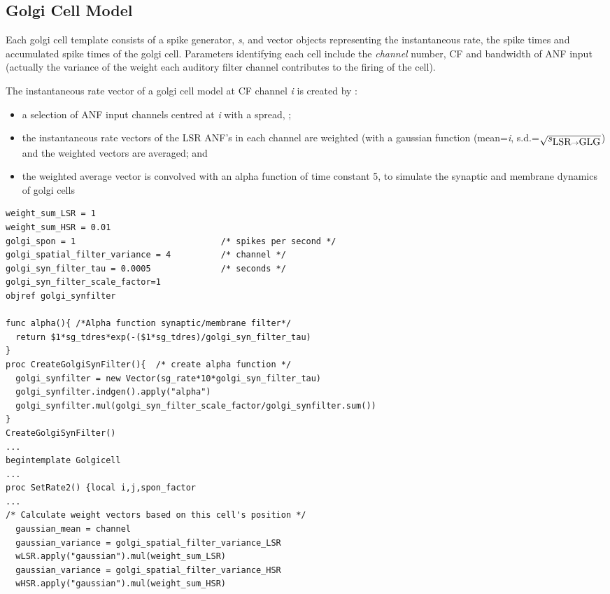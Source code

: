 \begin{appendix}
\begin{enumerate}
\end{enumerate}





\subsection{Golgi Cell Model}

Each golgi cell template consists of a spike generator, \emph{s}, and vector
objects representing the instantaneous rate, the spike times and
accumulated  spike times of the golgi cell. Parameters identifying
each cell include the \emph{channel} number, CF and bandwidth of ANF
input (actually the variance of the weight each auditory filter
channel contributes to the firing of the cell).

The instantaneous rate vector of a golgi cell model at CF channel
\emph{i} is created by :
\begin{itemize}
 \item a selection of ANF input channels centred at \emph{i} with a
 spread, \sLSRGLG;
 \item the instantaneous rate vectors of the LSR ANF's in each channel
 are weighted (with a gaussian function (mean=\emph{i},
 s.d.=$\sqrt{\protect s_{\protect\mbox{LSR} \to \mbox{GLG}}}$) and the weighted vectors are averaged; and
 \item the weighted average vector is convolved with an alpha function
 of time constant 5, to simulate the synaptic and membrane dynamics of
 golgi cells
\end{itemize}

 \medskip{}

\begin{lstlisting}[label=GolgiTemplate,caption=Create golgi cell rate vector within Golgi template (in CNcell.tem)]
weight_sum_LSR = 1
weight_sum_HSR = 0.01
golgi_spon = 1                             /* spikes per second */
golgi_spatial_filter_variance = 4          /* channel */
golgi_syn_filter_tau = 0.0005              /* seconds */
golgi_syn_filter_scale_factor=1
objref golgi_synfilter

func alpha(){ /*Alpha function synaptic/membrane filter*/
  return $1*sg_tdres*exp(-($1*sg_tdres)/golgi_syn_filter_tau)
}
proc CreateGolgiSynFilter(){  /* create alpha function */
  golgi_synfilter = new Vector(sg_rate*10*golgi_syn_filter_tau)
  golgi_synfilter.indgen().apply("alpha")  
  golgi_synfilter.mul(golgi_syn_filter_scale_factor/golgi_synfilter.sum()) 
}
CreateGolgiSynFilter()
...
begintemplate Golgicell
...
proc SetRate2() {local i,j,spon_factor
...
/* Calculate weight vectors based on this cell's position */
  gaussian_mean = channel
  gaussian_variance = golgi_spatial_filter_variance_LSR
  wLSR.apply("gaussian").mul(weight_sum_LSR)
  gaussian_variance = golgi_spatial_filter_variance_HSR
  wHSR.apply("gaussian").mul(weight_sum_HSR)


\end{lstlisting}
\end{appendix}
